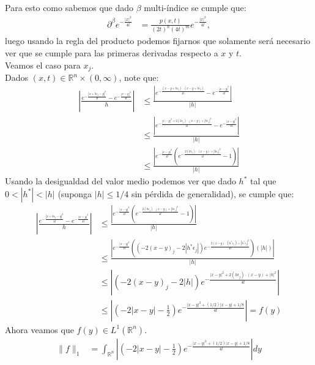\begin{homeworkProblem}
\begin{solucion}
\begin{enumerate}
        Para esto como sabemos que dado $\beta$ multi-índice se cumple que:
        \begin{align*}
          \partial^{\beta}e^{-\frac{|x|^2}{4t}}&=\frac{p(x,t)}{(2t)^n(4t)^m}e^{-\frac{|x|^2}{4t}}, 
        \end{align*}
        luego usando la regla del producto podemos fijarnos que solamente será necesario ver que se cumple para las primeras derivadas respecto a $x$ y $t$.\\
        Veamos el caso para $x_j$.\\
        Dados $(x,t)\in\mathbb{R}^{n}\times (0,\infty)$, note que:
        \begin{align*}
          \left| \frac{e^{-\frac{|x+h\epsilon_j-y|^2}{4t}}-e^{-\frac{|x-y|^2}{4t}}}{h} \right|&\leq\frac{\left| e^{-\frac{(x-y+h\epsilon_j)\cdot(x-y+h\epsilon_j)}{4t}}-e^{-\frac{|x-y|^2}{4t}} \right|}{|h|}\\
          &\leq\frac{\left| e^{-\frac{|x-y|^2+2(h\epsilon_j)\cdot(x-y)+|h\epsilon_j|^2}{4t}}-e^{-\frac{|x-y|^2}{4t}} \right|}{|h|}\\
          &\leq \frac{\left| e^{-\frac{|x-y|^2}{4t}}\left( e^{-\frac{2(h\epsilon_j)\cdot(x-y)+|h\epsilon_j|^2}{4t}}-1 \right) \right|}{|h|}
        \end{align*}
        Usando la desigualdad del valor medio podemos ver que dado $h^*$ tal que $0<|h^*|<|h|$ (suponga $|h|\leq 1/4$ sin pérdida de generalidad), se cumple que:
        \begin{align*}
          \left| \frac{e^{-\frac{|x+h\epsilon_j-y|^2}{4t}}-e^{-\frac{|x-y|^2}{4t}}}{h} \right| &\leq \frac{\left| e^{-\frac{|x-y|^2}{4t}}\left( e^{-\frac{2(h\epsilon_j)\cdot(x-y)+|h\epsilon_j|^2}{4t}}-1 \right) \right|}{|h|}\\
          &\leq \frac{\left| e^{-\frac{|x-y|^2}{4t}}\left( (-2(x-y)_j-2|h^*\epsilon_j|)e^{-\frac{2(x-y)\cdot(h^*\epsilon_j)+|h^*\epsilon_j|^2}{4t}} \right)(|h|) \right|}{|h|}\\
          &\leq \left| (-2(x-y)_j -2|h|)e^{-\frac{|x-y|^2+2(h\epsilon_j)\cdot(x-y)+|h|^2}{4t}}\right|\\
          &\leq \left| \left(-2|x-y| -\frac{1}{2}\right)e^{-\frac{|x-y|^2+(1/2)|x-y|+1/8}{4t}}\right|=f(y)
        \end{align*}
        Ahora veamos que $f(y)\in L^1(\mathbb{R}^{n})$.\\
        \begin{align*}
          \|f\|_1&=\int_{\mathbb{R}^{n}} \left| \left(-2|x-y| -\frac{1}{2}\right)e^{-\frac{|x-y|^2+(1/2)|x-y|+1/8}{4t}}\right|dy\\

\end{align*}
\end{enumerate}
\end{solucion}
\end{homeworkProblem}
